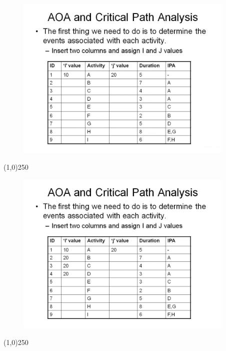 \begin{frame}
\begin{figure}
	\centering
		\includegraphics[width = 10.5cm]{oldnotes/Slide63.jpg}
\end{figure}
\end{frame}
\begin{center}\line(1,0){250}\end{center}


\begin{frame}
\begin{figure}
	\centering
		\includegraphics[width = 10.5cm]{oldnotes/Slide64.jpg}
\end{figure}
\end{frame}
\begin{center}\line(1,0){250}\end{center}


